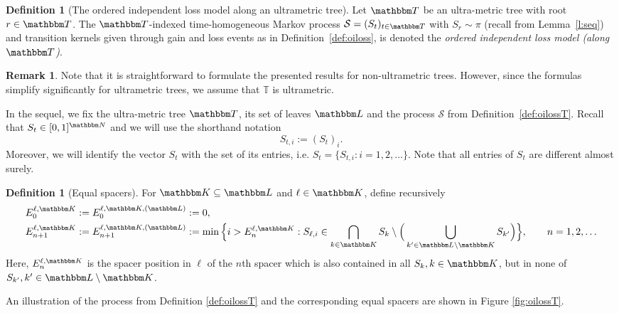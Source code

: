\documentclass[preprint,authoryear]{elsarticle}
\theoremstyle{definition}
\newtheorem{definition}[proposition]{Definition}
\newtheorem{remark}[proposition]{Remark}
\numberwithin{equation}{section}
\numberwithin{figure}{section}
\begin{document}
\begin{definition}[The ordered independent loss model along an ultrametric tree\label{def:oilossT}]
  Let $\mathbbm T$ be an ultra-metric tree with root $r\in\mathbbm T$.
  The $\mathbbm T$-indexed time-homogeneous Markov process
  $\mathcal S = (S_t)_{t\in\mathbbm T}$ with $S_r\sim\pi$ (recall from
  Lemma~\ref{l:seq}) and transition kernels given through gain and
  loss events as in Definition~\ref{def:oiloss}, is denoted the
  \emph{ordered independent loss model (along $\mathbbm T$)}.
\end{definition}

\begin{remark}
 Note that it is straightforward to formulate the presented results for non-ultrametric trees.
 However, since the formulas simplify significantly for ultrametric trees, we assume that $\mathbb T$ is ultrametric.
\end{remark}


In the sequel, we fix the ultra-metric tree $\mathbbm T$, its set of
leaves $\mathbbm L$ and the process $\mathcal S$ from
Definition~\ref{def:oilossT}. Recall that $S_t \in [0,1]^{\mathbbm N}$
and we will use the shorthand notation
$$ S_{t,i} := (S_t)_i.$$
Moreover, we will identify the vector $S_t$ with the set of its
entries, i.e. $S_t = \{S_{t, i}: i=1,2,\dots\}$. Note that all entries
of $S_t$ are different almost surely.

\begin{definition}[Equal spacers\label{def:eqsp}]
  For $\mathbbm K\subseteq \mathbbm L$ and $\ell\in\mathbbm K$, define
  recursively
  \begin{align*}
    E^{\ell, \mathbbm K}_{0} 
    & := E^{\ell, \mathbbm K, (\mathbbm L)}_{0} := 0,
    \\
    E^{\ell, \mathbbm K}_{n+1} 
    & := E^{\ell, \mathbbm K, (\mathbbm L)}_{n+1} := \min\Big\{i > E^{\ell, \mathbbm K}_{n}: S_{\ell,i} \in \bigcap_{k\in\mathbbm K} S_k 
      \setminus \Big(\bigcup_{k'\in\mathbbm L\setminus \mathbbm K} S_{k'}\Big) \Big\}, \qquad n=1,2,\dots
  \end{align*}
  Here, $E^{\ell, \mathbbm K}_{n}$ is the spacer position in $\ell$ of
  the $n$th spacer which is also contained in all
  $S_k, k\in\mathbbm K$, but in none of
  $S_{k'}, k'\in \mathbbm L\setminus\mathbbm K$.
\end{definition}

An illustration of the process from Definition \ref{def:oilossT} and the corresponding equal spacers are shown in Figure \ref{fig:oilossT}.
\end{document}
